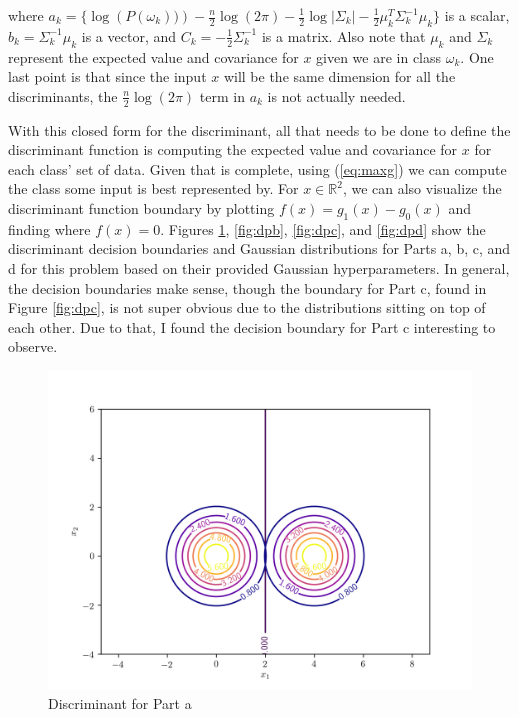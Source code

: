 \documentclass{article}[12pt]
\begin{document}
   where $a_k  = \lbrace \log\left( P(\omega_k) )\right) - \frac{n}{2} \log\left(2\pi\right) - \frac{1}{2}\log|\Sigma_k| - \frac{1}{2} \mu_k^{T} \Sigma_k^{-1} \mu_k \rbrace$ is a scalar, $b_k = \Sigma_k^{-1} \mu_k$ is a vector, and $C_k = - \frac{1}{2} \Sigma_k^{-1}$ is a matrix. Also note that $\mu_k$ and $\Sigma_k$ represent the expected value and covariance for $x$ given we are in class $\omega_k$. One last point is that since the input $x$ will be the same dimension for all the discriminants, the $\frac{n}{2} \log\left(2\pi\right)$ term in $a_k$ is not actually needed. 

   With this closed form for the discriminant, all that needs to be done to define the discriminant function is computing the expected value and covariance for $x$ for each class' set of data. Given that is complete, using (\ref{eq:maxg}) we can compute the class some input is best represented by. For $x \in \mathbb{R}^2$, we can also visualize the discriminant function boundary by plotting $f(x) = g_1(x) - g_0(x)$ and finding where $f(x) = 0$. Figures \ref{fig:dpa}, \ref{fig:dpb}, \ref{fig:dpc}, and \ref{fig:dpd} show the discriminant decision boundaries and Gaussian distributions for Parts a, b, c, and d for this problem based on their provided Gaussian hyperparameters. In general, the decision boundaries make sense, though the boundary for Part c, found in Figure \ref{fig:dpc}, is not super obvious due to the distributions sitting on top of each other. Due to that, I found the decision boundary for Part c interesting to observe.

	\begin{figure}[ht]
		\centerline{
			\includegraphics[scale=0.7]{../scripts/p1/discriminant_a.png}}
		\caption{Discriminant for Part a}
		\label{fig:dpa}
	\end{figure}
\end{document}
